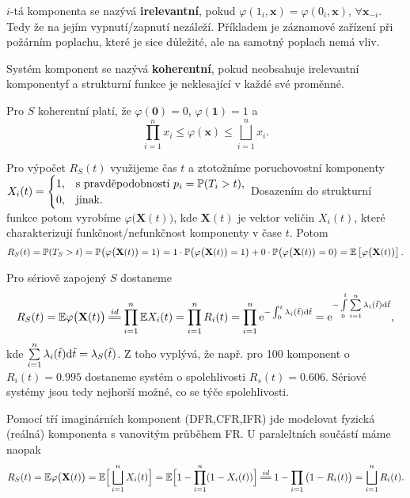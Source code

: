 \begin{define}
	$i$-tá komponenta se nazývá \textbf{irelevantní}, pokud $\varphi(1_i,\textbf{x})=\varphi(0_i,\textbf{x})$, $\forall\textbf{x}_{-i}$. Tedy že na jejím vypnutí/zapnutí nezáleží. Příkladem je záznamové zařízení při požárním poplachu, které je sice důležité, ale na samotný poplach nemá vliv.
\end{define}

\begin{define}
	Systém komponent se nazývá \textbf{koherentní}, pokud neobsahuje irelevantní komponentyf a strukturní funkce je neklesající v každé své proměnné.
\end{define}

\begin{theorem}
	Pro $S$ koherentní platí, že $\varphi(\textbf{0})=0$, $\varphi(\textbf{1})=1$ a $$ \prod_{i=1}^n x_i\leq \varphi(\textbf{x})\leq \bigsqcup_{i=1}^n x_i. $$
\end{theorem}

\begin{corollary}
	Pro výpočet $R_S(t)$ využijeme čas $t$ a ztotožníme poruchovostní komponenty $X_i(t)=\begin{cases}
1,&\text{s pravděpodobností }p_i=\mathbb{P}(T_i>t),\\0,&\text{jinak.}
\end{cases}$ Dosazením do strukturní funkce potom vyrobíme $\varphi\big(\textbf{X}(t)\big)$, kde $\textbf{X}(t)$ je vektor veličin $X_i(t)$, které charakterizují funkčnost/nefunkčnost komponenty v čase $t$. Potom
$$ R_S(t)=\mathbb{P}(T_S>t)=\mathbb{P}\big(\varphi\big(\textbf{X}(t)\big)=1\big)=1\cdot\mathbb{P}\big(\varphi\big(\textbf{X}(t)\big)=1\big)+0\cdot\mathbb{P}\big(\varphi\big(\textbf{X}(t)\big)=0\big)=\mathbb{E}\left[ \varphi\big(\textbf{X}(t)\big) \right]. $$
\end{corollary}

\begin{example}
	Pro sériově zapojený $S$ dostaneme
	$$ R_S(t)=\E \varphi\big(\textbf{X}(t)\big)\equal{id}\prod_{i=1}^n \E X_i(t)=\prod_{i=1}^n R_i(t)=\prod_{i=1}^n \e{-\int_{0}^{t}\lambda_i(\tilde{t})\d\tilde{t}}=\e{-\int\limits_{0}^t\sumin \lambda_i(\tilde{t})\d\tilde{t}}, $$
	kde $\sum\limits_{i=1}^{n} \lambda_i(\tilde{t})\mathrm{d}\tilde{t}=\lambda_S(\tilde{t})$. Z toho vyplývá, že např. pro 100 komponent o $R_i(t)=0.995$ dostaneme systém o spolehlivosti $R_s(t)=0.606$. Sériové systémy jsou tedy nejhorší možné, co se týče spolehlivosti. 
\end{example}

\begin{example}
	Pomocí tří imaginárních komponent (DFR,CFR,IFR) jde modelovat fyzická (reálná) komponenta s vanovitým průběhem FR. U paraleltních součástí máme naopak 
	$$ R_S(t)=\E\varphi\big(\textbf{X}(t)\big)=\E\Big[\bigsqcup_{i=1}^n X_i(t)\Big]=\E\Big[1-\prod_{i=1}^n(1-X_i(t))\Big]\equal{id}1-\prod_{i=1}\big(1-R_i(t)\big)=\bigsqcup_{i=1}^n R_i(t). $$
\end{example}

